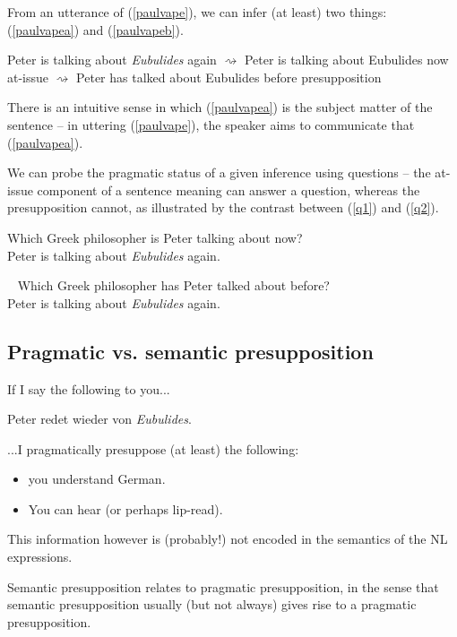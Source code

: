 \documentclass[cronos,landscape,paper=letter]{ling-handout}
\begin{document}
From an utterance of (\ref{paulvape}), we can infer (at least) two things: (\ref{paulvapea}) and (\ref{paulvapeb}).

\pex\label{paulvape}
Peter is talking about \textit{Eubulides} again
\a\label{paulvapea}\(⇝\) \textsf{Peter is talking about Eubulides now} \hfill at-issue
\a\label{paulvapeb}\(⇝\) \textsf{Peter has talked about Eubulides before} \hfill presupposition
\xe

There is an intuitive sense in which (\ref{paulvapea}) is the subject matter of the sentence -- in uttering (\ref{paulvape}), the speaker aims to communicate that (\ref{paulvapea}).

We can probe the pragmatic status of a given inference using questions -- the at-issue component of a sentence meaning can answer a question, whereas the presupposition cannot, as illustrated by the contrast between (\ref{q1}) and (\ref{q2}).

\ex\label{q1}
Which Greek philosopher is Peter talking about now?\\
\ljudge{\cmark} Peter is talking about \textit{Eubulides} again.
\xe

\ex~\label{q2}
Which Greek philosopher has Peter talked about before?\\
\ljudge{\#}Peter is talking about \textit{Eubulides} again.
\xe

\subsection{Pragmatic vs. semantic presupposition}

If I say the following to you...

\ex
Peter redet wieder von \textit{Eubulides}.
\xe

...I pragmatically presuppose (at least) the following:

\begin{itemize}

  \item you understand German.

  \item You can hear (or perhaps lip-read).

\end{itemize}

This information however is (probably!) not encoded in the semantics of the NL expressions.

Semantic presupposition relates to pragmatic presupposition, in the sense that semantic presupposition usually (but not always) gives rise to a pragmatic presupposition.
\end{document}
